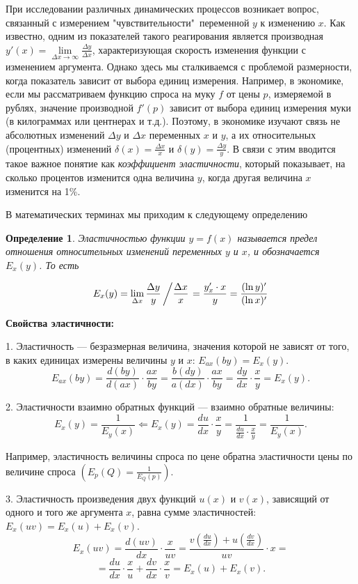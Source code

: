 \documentclass[12pt,openbib]{report}
\newtheorem{opr}{\hspace{5mm} Определение}[chapter]
\begin{document}
При исследовании различных динамических процессов возникает вопрос,
связанный с измерением "чувствительности"\, переменной $y$ к
изменению $x$. Как известно, одним из показателей такого
реагирования является производная $y'(x)=\lim\limits_{\Delta
x\to\infty}\frac{\Delta y}{\Delta x}$, характеризующая скорость
изменения функции с изменением аргумента. Однако здесь мы
сталкиваемся с проблемой размерности, когда показатель зависит от
выбора единиц измерения. Например, в экономике, если мы
рассматриваем функцию спроса на муку $f$ от цены $p$, измеряемой в
рублях, значение производной $f'(p)$ зависит от выбора единиц
измерения муки (в килограммах или центнерах и т.д.). Поэтому, в
экономике изучают связь не абсолютных изменений $\Delta y$ и $\Delta
x$ переменных $x$ и $y$, а их относительных (процентных) изменений
$\delta(x)=\frac{\Delta x}x$ и $\delta(y)=\frac{\Delta y}y$. В связи
с этим вводится такое важное понятие как {\it коэффициент
эластичности}, который показывает, на сколько процентов изменится
одна величина $y$, когда другая величина $x$ изменится на 1\%.

В математических терминах мы приходим к следующему определению

\begin{opr}
Эластичностью функции $y=f(x)$ называется
предел отношения относительных изменений переменных $y$ и $x$, и
обозначается $E_x(y)$. То есть

\begin{equation}\label{f132}
E_x(y)=\lim_{\Delta x}\frac{\Delta y}y\left/\frac{\Delta
x}x\right.=\frac{y_x'\cdot x}y=\frac{(\ln y)'}{(\ln
x)'}
\end{equation}
\end{opr}


{\bf Свойства эластичности:}

1. Эластичность --- безразмерная величина, значения которой не
зависят от того, в каких единицах измерены величины $y$ и $x$:
$E_{ax}(by)=E_x(y)$.
$$E_{ax}(by)=\frac{d(by)}{d(ax)}\cdot\frac{ax}{by}=\frac{b(dy)}{a(dx)}\cdot\frac{ax}{by}=
\frac{dy}{dx}\cdot\frac xy=E_x(y).$$

2. Эластичности взаимно обратных функций --- взаимно обратные
величины:
$$E_x(y)=\frac1{E_y(x)}\Leftarrow E_x(y)=\frac{du}{dx}\cdot\frac
xy=\frac1{\frac{du}{dx}\cdot\frac xy}=\frac1{E_y(x)}.$$

Например, эластичность величины спроса по цене обратна эластичности
цены по величине спроса $\left(E_p(Q)=\frac1{E_Q(p)}\right)$.

3. Эластичность произведения двух функций $u(x)$ и $v(x)$, зависящий
от одного и того же аргумента $x$, равна сумме эластичностей:
$E_x(uv)=E_x(u)+E_x(v)$. $$E_x(uv)=\frac{d(uv)}{dx}\cdot\frac
x{uv}=\frac{v\left(\frac{du}{dx}\right)+u\left(\frac{dv}{dx}\right)}{uv}\cdot
x=$$ $$=\frac{du}{dx}\cdot \frac xu+\frac{dv}{dx}\cdot\frac
xv=E_x(u)+E_x(v).$$
\end{document}
